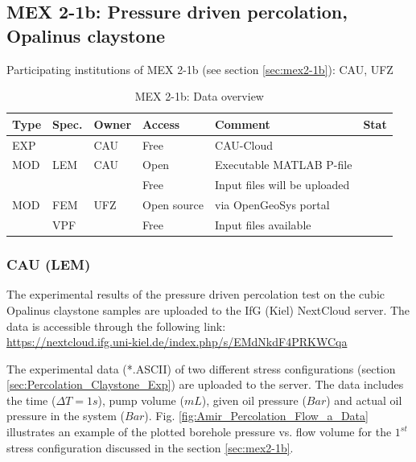 \subsection{MEX 2-1b: Pressure driven percolation, Opalinus claystone}

Participating institutions of MEX 2-1b (see section \ref{sec:mex2-1b}): CAU, UFZ

\begin{table}[ht!]
\caption{MEX 2-1b: Data overview}
\label{tab:dms-mex21b-overview}
\small
\begin{tabular}{l|l|l|l|L{4.7cm}|l}
\hline
{}
Type & Spec. & Owner & Access     & Comment                       & Stat \\ 
\hline
EXP  &       & CAU   & Free       & CAU-Cloud                     &  \\
\hline \hline
MOD  & LEM   & CAU   & Open       & Executable MATLAB P-file      &  \\
     &       &       & Free       & Input files will be uploaded  &  \\
\hline
MOD  & FEM   & UFZ   & Open source & via OpenGeoSys portal        &  \\
     & VPF   &       & Free       & Input files available         &  \\
%
\hline
\end{tabular}
\end{table}
\normalsize

\subsubsection*{CAU (LEM)}

The experimental results of the pressure driven percolation test on the cubic Opalinus claystone samples are uploaded to the IfG (Kiel) NextCloud server. The data is accessible through the following link:\\
\url{https://nextcloud.ifg.uni-kiel.de/index.php/s/EMdNkdF4PRKWCqa}

The experimental data (*.ASCII) of two different stress configurations (section \ref{sec:Percolation_Claystone_Exp}) are uploaded to the server. The data includes the time ($\Delta T=1s$), pump volume ($mL$), given oil pressure ($Bar$) and actual oil pressure in the system ($Bar$). Fig. \ref{fig:Amir_Percolation_Flow_a_Data}
illustrates an example of the plotted borehole pressure vs. flow volume for the $1^{st}$ stress configuration discussed in the section \ref{sec:mex2-1b}.

